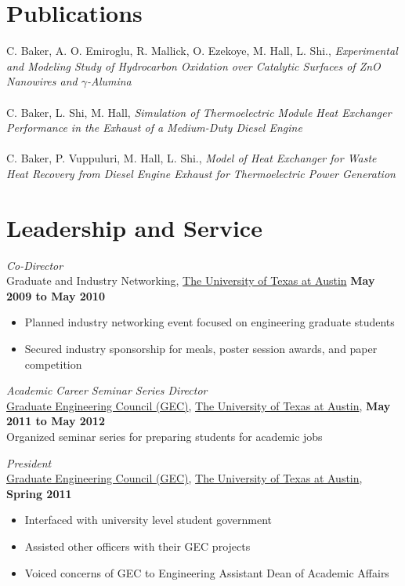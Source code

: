 \documentclass[centered]{res}
\begin{document}
\begin{resume}
\section{Publications}

C. Baker, A. O. Emiroglu, R. Mallick, O. Ezekoye, M. Hall, L. Shi.,
\textit{Experimental and Modeling Study of Hydrocarbon Oxidation over
  Catalytic Surfaces of ZnO Nanowires and $\gamma$-Alumina} \\
\vspace{-5pt} \\
%
C. Baker, L. Shi, M. Hall, \textit{Simulation of Thermoelectric
  Module Heat Exchanger Performance in the Exhaust of a Medium-Duty
  Diesel Engine}  \\
\vspace{-5pt} \\
%
C. Baker, P. Vuppuluri, M. Hall, L. Shi., \textit{Model of Heat
  Exchanger for Waste Heat Recovery from Diesel Engine Exhaust for
  Thermoelectric Power Generation}

\newpage
\section{Leadership and Service}
\textit{Co-Director} \\
Graduate and Industry Networking,
\href{http://www.utexas.edu}{The University of Texas at Austin}
\hfill \textbf{May 2009 to May 2010}
\begin{itemize} \itemsep -2pt %
\item Planned industry networking event focused on engineering
  graduate students
\item Secured industry sponsorship for meals, poster session awards,
  and paper competition
\end{itemize}

\textit{Academic Career Seminar Series Director} \\
\href{http://sites.google.com/site/utexasgecouncil/}{Graduate Engineering Council (GEC)},
\href{http://www.utexas.edu}{The University of Texas at Austin},
\hfill \textbf{May 2011 to May 2012} \\ 
Organized seminar series for preparing students for academic jobs

\textit{President} \\
\href{http://sites.google.com/site/utexasgecouncil/}{Graduate Engineering Council (GEC)},
\href{http://www.utexas.edu}{The University of Texas at Austin},
\hfill \textbf{Spring 2011}
\begin{itemize} \itemsep -2pt %
\item Interfaced with university level student government
\item Assisted other officers with their GEC projects
\item Voiced concerns of GEC to Engineering Assistant Dean of Academic
  Affairs 
\end{itemize}


\end{resume}
\end{document}
